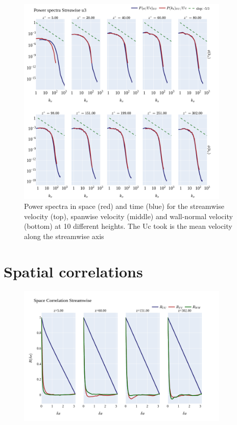 \documentclass[]{article}
\theoremstyle{plain}
\theoremstyle{remark}
\begin{document}
\begin{figure}[h!]
	\begin{center}
		\includegraphics[width=0.9\textwidth]{../output/split_time/frozen_turbulence/power_spectra/u3_all.png}
		\caption{Power spectra in space (red) and time (blue) for the streamwise velocity (top), spanwise velocity (middle) and wall-normal velocity (bottom) at 10 different heights. The Uc took is the mean velocity along the streamwise axis}
	\end{center}
\end{figure}

\section*{Spatial correlations}


\begin{figure}[h!]
	\begin{center}
		\includegraphics[width=0.9\textwidth]{../output/split_time/space_correlation/streamwise.png}
	\end{center}
\end{figure}
\end{document}
